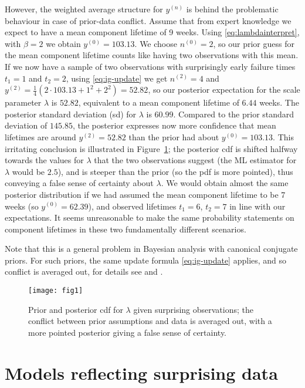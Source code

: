 \documentclass[Journal,letterpaper]{ascelike-new}
\newcommand{\uz}{^{(0)}} %
\newcommand{\un}{^{(n)}} %
\def\yz{y\uz}
\def\yn{y\un}
\newcommand{\yfun}[1]{y^{({#1})}}
\def\nz{n\uz}
\newcommand{\nfun}[1]{n^{({#1})}}
\begin{document}
However, the weighted average structure for $\yn$
is behind the problematic behaviour in case of prior-data conflict.
Assume that from expert knowledge we expect
to have a mean component lifetime of 9 weeks.
Using \eqref{eq:lambdainterpret}, with $\beta=2$ we obtain $\yz = 103.13$.
We choose $\nz = 2$, so our prior guess for the mean component lifetime
counts like having two observations with this mean.
If we now have a sample of two observations
with surprisingly early failure times $t_1 = 1$ and $t_2 = 2$,
using \eqref{eq:ig-update} we get $\nfun{2} = 4$
and $\yfun{2} = \frac{1}{4}(2 \cdot 103.13 + 1^2 + 2^2) = 52.82$,
so our posterior expectation for the scale parameter $\lambda$ is $52.82$,
equivalent to a mean component lifetime of $6.44$ weeks.
The posterior standard deviation (sd) for $\lambda$ is $60.99$.
Compared to the prior standard deviation of $145.85$,
the posterior expresses now more confidence that mean lifetimes are around $\yfun{2} = 52.82$
than the prior had about $\yz = 103.13$.
This irritating conclusion is illustrated in Figure~\ref{fig:weibull-pdc};
the posterior cdf is shifted halfway towards the values for $\lambda$
that the two observations suggest
(the ML estimator for $\lambda$ would be $2.5$),
and is steeper than the prior (so the pdf is more pointed),
thus conveying a false sense of certainty about $\lambda$.
We would obtain almost the same %
posterior distribution
if we had assumed the mean component lifetime to be 7 weeks (so $\yz = 62.39$),
and observed lifetimes $t_1 = 6$, $t_2 = 7$ in line with our expectations.
It seems unreasonable to make the same probability statements on component lifetimes in these two fundamentally different scenarios.

Note that this is a general problem in Bayesian analysis with canonical conjugate priors.
For such priors, the same update formula \eqref{eq:ig-update} applies,
and so conflict is averaged out, for details see  and .

\begin{figure}
\centering
\texttt{[image: fig1]}
\caption{Prior and posterior cdf for $\lambda$ given surprising observations;
the conflict between prior assumptions and data is averaged out,
with a more pointed posterior giving a false sense of certainty.}
\label{fig:weibull-pdc}
\end{figure}


\section{Models reflecting surprising data}
\label{sec:modforsurpr}
\end{document}
